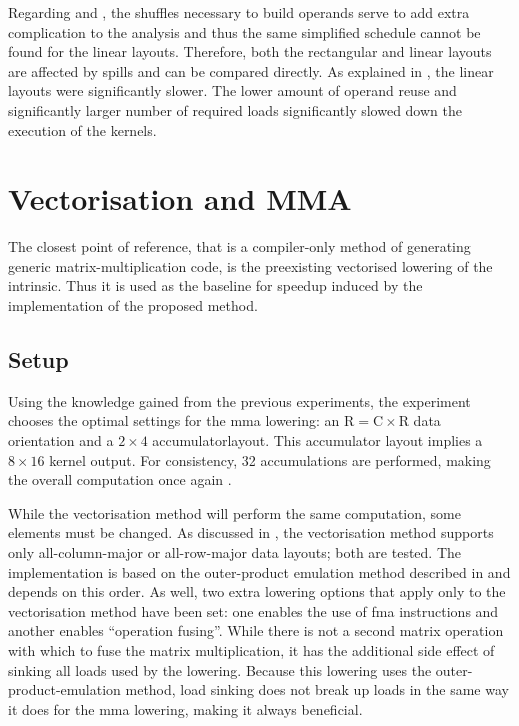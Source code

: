 \documentclass[\main/thesis.tex]{subfiles}
\begin{document}
Regarding  and , the shuffles necessary to build operands serve to add extra complication to the  analysis and thus the same simplified schedule cannot be found for the linear layouts.
Therefore, both the rectangular and linear layouts are affected by spills and can be compared directly.
As explained in , the linear layouts were significantly slower.
The lower amount of operand reuse and significantly larger number of required loads significantly slowed down the execution of the kernels.

\section{Vectorisation and MMA}
The closest point of reference, that is a compiler-only method of generating generic matrix-multiplication code, is the preexisting vectorised lowering of the  intrinsic.
Thus it is used as the baseline for speedup induced by the implementation of the proposed method.

\subsection{Setup}
Using the knowledge gained from the previous experiments, the experiment chooses the optimal settings for the \gls{mma} lowering: an $\textrm{R} = \textrm{C} \times \textrm{R}$ data orientation and a $2 \times 4$ accumulator\footnotemark layout.
This accumulator layout implies a $8 \times 16$ kernel output.
For consistency, 32 accumulations are performed, making the overall computation once again .

While the vectorisation method will perform the same computation, some elements must be changed.
As discussed in , the vectorisation method supports only all-column-major or all-row-major data layouts; both are tested.
The implementation is based on the outer-product emulation method described in  and depends on this order.
As well, two extra \gls{lowering} options that apply only to the vectorisation method have been set: one enables the use of \gls{fma} instructions and another enables ``operation fusing''.
While there is not a second matrix operation with which to fuse the matrix multiplication, it has the additional side effect of sinking all loads used by the \gls{lowering}.
Because this \gls{lowering} uses the outer-product-emulation method, load sinking does not break up loads in the same way it does for the \gls{mma} \gls{lowering}, making it always beneficial.
\end{document}
